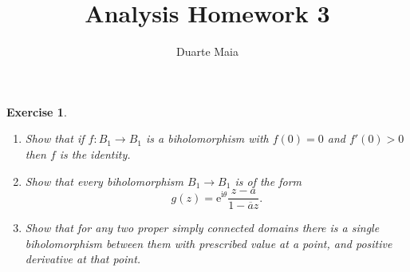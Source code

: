 \documentclass{article}
\title{Analysis Homework 3}
\author{Duarte Maia}
\newtheorem{ex}{Exercise}
\theoremstyle{nonumberplain}
\newcommand{\I}{\mathrm{i}}
\newcommand{\e}{\mathrm{e}}
\newcommand{\conj}[1]{\overline{#1}}
\begin{document}
\maketitle

\begin{ex}
\leavevmode
\begin{enumerate}
\item Show that if $f \colon B_1 \to B_1$ is a biholomorphism with $f(0) = 0$ and $f'(0) > 0$ then $f$ is the identity.
\item Show that every biholomorphism $B_1 \to B_1$ is of the form
\begin{equation}
g(z) = \e^{\I \theta} \frac{z-a}{1-\conj a z}.
\end{equation}
\item Show that for any two proper simply connected domains there is a single biholomorphism between them with prescribed value at a point, and positive derivative at that point.
\end{enumerate}
\end{ex}
\end{document}
